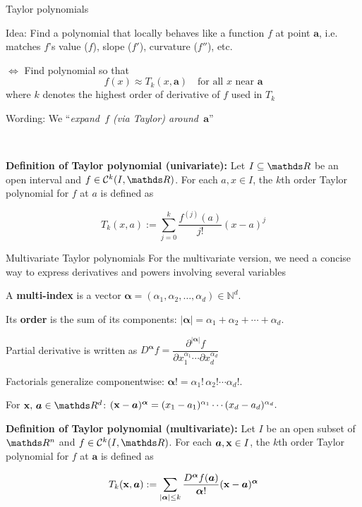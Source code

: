 \documentclass[11pt,compress,t,notes=noshow, xcolor=table]{beamer}
\begin{document}
\begin{frame2}{Taylor polynomials}
\begin{itemizeM}
    \item Idea: Find a polynomial that locally behaves like a function $f$ at point $\bm{a}$, i.e. matches $f$’s value ($f$), slope ($f'$), curvature ($f''$), etc.
    \item[$\Leftrightarrow$] Find polynomial so that 
    $$
    f(x)\approx T_k(x,\bm{a})\quad \text{for all $x$ near $\bm{a}$} 
    $$
    where $k$ denotes the highest order of derivative of $f$ used in $T_k$
    \item Wording: We ``\textit{expand~$f$ (via Taylor) around~$\bm{a}$}''
\end{itemizeM}\,

\textbf{Definition of Taylor polynomial (univariate):} 
Let $I \subseteq \R$ be an open interval and $f \in \mathcal{C}^k(I,\R)$.
For each $a,x \in I$, the $k$th order Taylor polynomial for $f$ at $a$ is defined as

$$
T_k(x,a):=\sum_{j=0}^k \frac{f^{(j)}(a)}{j!}(x-a)^j
$$

\end{frame2}


\begin{frame2}{Multivariate Taylor polynomials}
For the multivariate version, we need a concise way to express derivatives and powers involving several variables
\begin{itemizeM}
  \item A \textbf{multi-index} is a vector       $
        \bm{\alpha} = (\alpha_1, \alpha_2, \dots, \alpha_d) \in \mathbb{N}^d.
        $

  \item Its \textbf{order} is the sum of its components:
        $
        |\bm{\alpha}| = \alpha_1 + \alpha_2 + \cdots + \alpha_d.
        $

  \item Partial derivative is written as
        $
        D^{\bm{\alpha}} f = \dfrac{\partial^{|\bm{\alpha}|} f}{\partial x_1^{\alpha_1} \cdots \partial x_d^{\alpha_d}}
        $

  \item Factorials generalize componentwise:
        $
        \bm{\alpha}! = \alpha_1! \, \alpha_2! \cdots \alpha_d!.
        $

    \item For $\xv,\,\bm{a}\in\R^d$: $
        (\mathbf{x} - \bm{a})^{\bm{\alpha}} = (x_1 - a_1)^{\alpha_1} \cdots (x_d - a_d)^{\alpha_d}.
        $
\end{itemizeM}

\textbf{Definition of Taylor polynomial (multivariate):} Let $I$ be an open subset of $\R^n$ and $f \in \mathcal{C}^k(I,\R)$.
For each $\bm{a},\mathbf{x} \in I$, the $k$th order Taylor polynomial for $f$ at $\bm{a}$ is defined as

$$
T_k(\mathbf{x}, \bm{a}):=\sum_{|\bm{\alpha}| \le k} \frac{D^{\bm{\alpha}} f(\bm{a})}{{\bm{\alpha}}!} (\mathbf{x} - \bm{a})^{\bm{\alpha}}
$$
\end{frame2}
\end{document}
